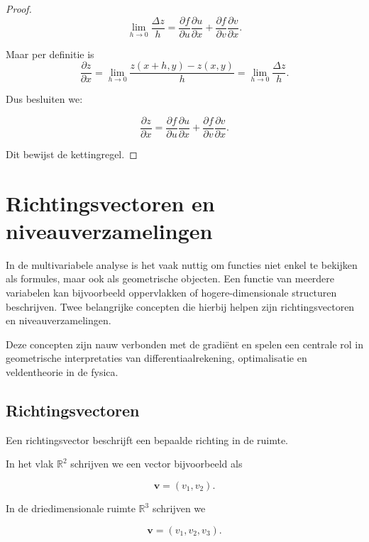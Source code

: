\documentclass[11pt,a4paper]{article}
\begin{document}
\begin{proof}
        \[
            \lim_{h\to0}\frac{\Delta z}{h}
            =
            \frac{\partial f}{\partial u}\frac{\partial u}{\partial x}
            +
            \frac{\partial f}{\partial v}\frac{\partial v}{\partial x}.
        \]

        Maar per definitie is
        \[
            \frac{\partial z}{\partial x}
            =
            \lim_{h\to0}\frac{z(x+h,y)-z(x,y)}{h}
            =
            \lim_{h\to0}\frac{\Delta z}{h}.
        \]

        Dus besluiten we:

        \[
            \frac{\partial z}{\partial x}
            =
            \frac{\partial f}{\partial u}\frac{\partial u}{\partial x}
            +
            \frac{\partial f}{\partial v}\frac{\partial v}{\partial x}.
        \]

        Dit bewijst de kettingregel.
    \end{proof}


    \section{Richtingsvectoren en niveauverzamelingen}

    In de multivariabele analyse is het vaak nuttig om functies niet enkel te bekijken
    als formules, maar ook als geometrische objecten. Een functie van meerdere variabelen
    kan bijvoorbeeld oppervlakken of hogere-dimensionale structuren beschrijven.
    Twee belangrijke concepten die hierbij helpen zijn richtingsvectoren en
    niveauverzamelingen.

    Deze concepten zijn nauw verbonden met de gradiënt en spelen een centrale rol
    in geometrische interpretaties van differentiaalrekening, optimalisatie en
    veldentheorie in de fysica.

    \subsection{Richtingsvectoren}

    Een richtingsvector beschrijft een bepaalde richting in de ruimte.

    In het vlak $\mathbb{R}^2$ schrijven we een vector bijvoorbeeld als

    \[
        \mathbf{v} = (v_1, v_2).
    \]

    In de driedimensionale ruimte $\mathbb{R}^3$ schrijven we

    \[
        \mathbf{v} = (v_1, v_2, v_3).
    \]
\end{document}
